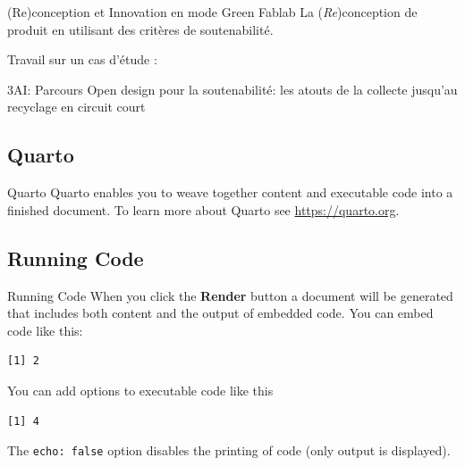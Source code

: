 \documentclass[
  11pt,
  ignorenonframetext,
  aspectratio=169,
  c]{beamer}
\begin{document}
\begin{frame}{(Re)conception et Innovation en mode Green Fablab}
\protect\hypertarget{reconception-et-innovation-en-mode-green-fablab}{}
La (\emph{Re})conception de produit en utilisant des critères de
soutenabilité.

\begin{block}{Travail sur un cas d'étude :}
\protect\hypertarget{travail-sur-un-cas-duxe9tude-1}{}
\end{block}
\end{frame}

\begin{frame}{3AI: Parcours}
\protect\hypertarget{ai-parcours}{}
Open design pour la soutenabilité: les atouts de la collecte jusqu'au
recyclage en circuit court
\end{frame}

\hypertarget{quarto}{%
\subsection{Quarto}\label{quarto}}

\begin{frame}{Quarto}
Quarto enables you to weave together content and executable code into a
finished document. To learn more about Quarto see
\url{https://quarto.org}.
\end{frame}

\hypertarget{running-code}{%
\subsection{Running Code}\label{running-code}}

\begin{frame}[fragile]{Running Code}
When you click the \textbf{Render} button a document will be generated
that includes both content and the output of embedded code. You can
embed code like this:

\begin{verbatim}
[1] 2
\end{verbatim}

You can add options to executable code like this

\begin{verbatim}
[1] 4
\end{verbatim}

The \texttt{echo:\ false} option disables the printing of code (only
output is displayed).
\end{frame}
\end{document}
